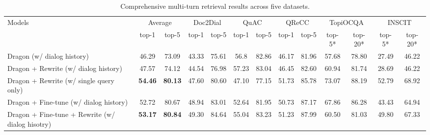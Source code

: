 \documentclass{article}
\begin{document}
\begin{table}[h]
\renewcommand{\arraystretch}{1.03}
\centering
\begin{adjustbox}{width={0.99\textwidth},totalheight={\textheight},keepaspectratio}
\begin{tabular}{lcccccccccccc}
\toprule
\multirow{2}{*}{Models}                                                                                                         & \multicolumn{2}{c}{Average} & \multicolumn{2}{c}{Doc2Dial} & \multicolumn{2}{c}{QuAC} & \multicolumn{2}{c}{QReCC} & \multicolumn{2}{c}{TopiOCQA} & \multicolumn{2}{c}{INSCIT} \\ \cmidrule(lr){2-3} \cmidrule(lr){4-5} \cmidrule(lr){6-7} \cmidrule(lr){8-9} \cmidrule(lr){10-11} \cmidrule(lr){12-13}
& top-1         & top-5        & top-1       & top-5      & top-1       & top-5   & top-1        & top-5     & top-5*       & top-20*       & top-5*        & top-20*        \\ \midrule
Dragon (w/ dialog history)   & 46.29       & 73.09    & 43.33         & 75.61        & 56.8        & 82.86      & 46.17       & 81.96       & 57.68        & 78.80   & 27.49 & 46.22           \\
Dragon + Rewrite (w/ dialog history)      & 47.57        & 74.12     & 44.54         & 76.98        & 57.23       & 83.04      & 46.45       & 82.60        & 60.94        & 81.74 & 28.69 & 46.22            \\ 
Dragon + Rewrite (w/ single query only)     & \textbf{54.46}       & \textbf{80.13}   & 47.60          & 80.60         & 47.10        & 77.15      & 51.73       & 85.78       & 73.07        & 88.19  & 52.79 & 68.92           \\ \midrule
Dragon + Fine-tune (w/ dialog history) &  52.72 & 80.67 & 48.94 & 83.01 & 52.64 & 81.95 & 50.73 & 87.17 & 67.86 & 86.28 & 43.43 & 64.94 \\
Dragon + Fine-tune + Rewrite (w/ dialog hisotry)    & \textbf{53.17}      & \textbf{80.84}   & 49.30          & 84.64        & 55.04       & 83.23      & 51.23       & 87.99       & 60.50         & 81.03  & 49.80 & 67.33        \\
\bottomrule
\end{tabular}
\end{adjustbox}
\caption{Comprehensive multi-turn retrieval results across five datasets.}
\label{tab:retrieval_all}
\end{table}
\end{document}
